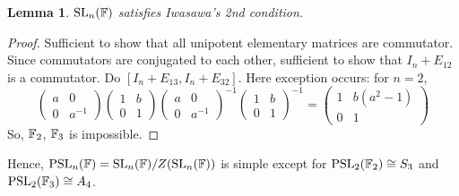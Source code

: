 \documentclass[12pt, letterpaper]{amsart}
\newtheorem{lem}[thm]{Lemma}
\theoremstyle{definition}
\theoremstyle{remark}
\newcommand{\PSL}{{\mathrm{PSL}}}
\theoremstyle{plain}
\numberwithin{equation}{section}
\begin{document}
\begin{lem}
    ${\mathrm{SL}}_n({\mathbb {F}})$ satisfies Iwasawa's 2nd condition. 
\end{lem}

\begin{proof}
    Sufficient to show that all unipotent elementary matrices are commutator. 
    Since commutators are conjugated to each other, sufficient to show that 
    $I_n + E_{12}$ is a commutator. Do $[I_n + E_{13}, I_n + E_{32}]$. 
    Here exception occurs: for $n = 2$, 
    \[\begin{pmatrix}
        a & 0 \\
        0 & a^{-1}
    \end{pmatrix} \begin{pmatrix}
        1 & b \\ 
        0 & 1
    \end{pmatrix} \begin{pmatrix}
        a & 0 \\
        0 & a^{-1}
    \end{pmatrix}^{-1} \begin{pmatrix}
        1 & b \\
        0 & 1
    \end{pmatrix}^{-1} 
    = 
    \begin{pmatrix}
        1 & b(a^2 - 1) \\ 
        0 & 1
    \end{pmatrix}\]
    So, ${\mathbb {F}}_2$, ${\mathbb {F}}_3$ is impossible. 
\end{proof}

Hence, $\PSL_n(\BF) = \SL_n(\BF)/Z(\SL_n(\BF))$ is simple except for $\PSL_2(\BF_2) \cong S_3$ and $\PSL_2(\BF_3) \cong A_4$.  
\end{document}
